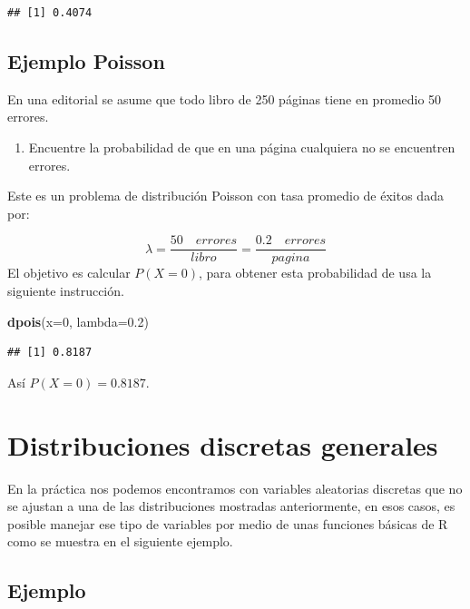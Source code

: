 \documentclass[10pt,]{krantz}
\makeatletter
\newenvironment{Shaded}{\begin{snugshade}}{\end{snugshade}}
\newcommand{\KeywordTok}[1]{\textcolor[rgb]{0.13,0.29,0.53}{\textbf{{#1}}}}
\newcommand{\DataTypeTok}[1]{\textcolor[rgb]{0.13,0.29,0.53}{{#1}}}
\newcommand{\DecValTok}[1]{\textcolor[rgb]{0.00,0.00,0.81}{{#1}}}
\newcommand{\FloatTok}[1]{\textcolor[rgb]{0.00,0.00,0.81}{{#1}}}
\newcommand{\NormalTok}[1]{{#1}}
\providecommand{\tightlist}{%
  \setlength{\itemsep}{0pt}\setlength{\parskip}{0pt}}
\let\proglang=\textsf
\newenvironment{kframe}{%
\medskip{}
\setlength{\fboxsep}{.8em}
 \def\at@end@of@kframe{}%
 \ifinner\ifhmode%
  \def\at@end@of@kframe{\end{minipage}}%
  \begin{minipage}{\columnwidth}%
 \fi\fi%
 \def\FrameCommand##1{\hskip\@totalleftmargin \hskip-\fboxsep
 \colorbox{shadecolor}{##1}\hskip-\fboxsep
     \hskip-\linewidth \hskip-\@totalleftmargin \hskip\columnwidth}%
 \MakeFramed {\advance\hsize-\width
   \@totalleftmargin\z@ \linewidth\hsize
   \@setminipage}}%
 {\par\unskip\endMakeFramed%
 \at@end@of@kframe}
\renewenvironment{Shaded}{\begin{kframe}}{\end{kframe}}
\makeatother
\begin{document}
\begin{verbatim}
## [1] 0.4074
\end{verbatim}

\subsection*{Ejemplo Poisson}\label{ejemplo-poisson}


En una editorial se asume que todo libro de 250 páginas tiene en
promedio 50 errores.

\begin{enumerate}
\def\labelenumi{\arabic{enumi})}
\tightlist
\item
  Encuentre la probabilidad de que en una página cualquiera no se
  encuentren errores.
\end{enumerate}

Este es un problema de distribución Poisson con tasa promedio de éxitos
dada por:

\[\lambda=\frac{50 \quad errores}{libro}=\frac{0.2 \quad errores}{pagina}\]
El objetivo es calcular \(P(X=0)\), para obtener esta probabilidad de
usa la siguiente instrucción.

\begin{Shaded}
\begin{Highlighting}[]
\KeywordTok{dpois}\NormalTok{(}\DataTypeTok{x=}\DecValTok{0}\NormalTok{, }\DataTypeTok{lambda=}\FloatTok{0.2}\NormalTok{)}
\end{Highlighting}
\end{Shaded}

\begin{verbatim}
## [1] 0.8187
\end{verbatim}

Así \(P(X=0)=0.8187\).

\section{Distribuciones discretas
generales}\label{distribuciones-discretas-generales}

En la práctica nos podemos encontramos con variables aleatorias
discretas que no se ajustan a una de las distribuciones mostradas
anteriormente, en esos casos, es posible manejar ese tipo de variables
por medio de unas funciones básicas de \proglang{R} como se muestra en
el siguiente ejemplo.

\subsection*{Ejemplo}\label{ejemplo-42}
\end{document}
